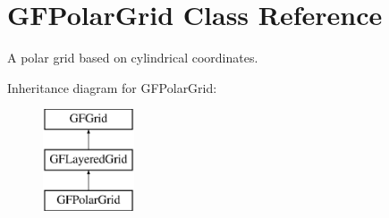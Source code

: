 \hypertarget{class_g_f_polar_grid}{\section{G\+F\+Polar\+Grid Class Reference}
\label{class_g_f_polar_grid}
}


A polar grid based on cylindrical coordinates. 


Inheritance diagram for G\+F\+Polar\+Grid\+:\begin{figure}[H]
\begin{center}
\leavevmode
\includegraphics[height=3.000000cm]{class_g_f_polar_grid}
\end{center}
\end{figure}
